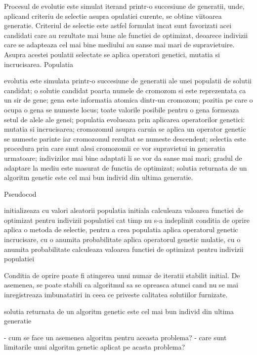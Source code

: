 Procesul de evolutie este simulat iterand printr-o succesiune de generatii, unde, aplicand criteriu de selectie asupra opulatiei curente, se obtine viitoarea generatie. Criteriul de selectie este astfel formulat incat sunt favorizati acei candidati care au rezultate mai bune ale functiei de optimizat, deoarece indivizii care se adapteaza cel mai bine mediului au sanse mai mari de supravietuire. Asupra acestei poulatii selectate se aplica operatori genetici, mutatia si incrucisarea.
Populatia




evolutia este simulata printr-o succesiune de generatii ale unei populatii de solutii candidat;
o solutie candidat poarta numele de cromozom si este reprezentata ca un sir de gene;
gena este informatia atomica dintr-un cromozom;
pozitia pe care o ocupa o gena se numeste locus;
toate valorile posibile pentru o gena formeaza setul de alele ale genei;
populatia evolueaza prin aplicarea operatorilor genetici: mutatia si incrucisarea;
cromozomul asupra caruia se aplica un operator genetic se numeste parinte iar cromozomul rezultat se numeste descendent;
selectia este procedura prin care sunt alesi cromozomii ce vor supravietui in generatia urmatoare; indivizilor mai bine adaptati li se vor da sanse mai mari;
gradul de adaptare la mediu este masurat de functia de optimizat;
solutia returnata de un algoritm genetic este cel mai bun individ din ultima generatie.


Pseudocod

initializeaza cu valori aleatorii populatia initiala
calculeaza valoarea functiei de optimizat pentru indivizii populatiei 
cat timp nu s-a indeplinit conditia de oprire
	aplica o metoda de selectie, pentru a crea populatia
	aplica operatorul genetic incrucisare, cu o anumita probabilitate
	aplica operatorul genetic mulatie, cu o anumita probabilitate
	calculeaza valoarea functiei de optimizat pentru indivizii populatiei
	
Conditia de oprire poate fi atingerea unui numar de iteratii stabilit initial. De asemenea, se poate stabili ca algoritmul sa se opreasca atunci cand nu se mai inregistreaza imbunatatiri in ceea ce priveste calitatea solutiilor furnizate. 


solutia returnata de un algoritm genetic este cel mai bun individ din ultima generatie 

- cum se face un asemenea algoritm pentru aceasta problema?
- care sunt limitarile unui algoritm genetic aplicat pe acasta problema?


